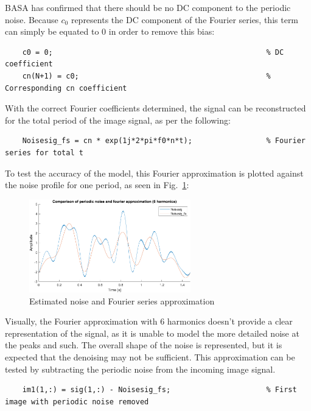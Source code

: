 \documentclass[12pt]{article}
\begin{document}
BASA has confirmed that there should be no DC component to the periodic noise.
Because $c_0$ represents the DC component of the Fourier series, this term can
simply be equated to 0 in order to remove this bias:

\begin{verbatim}
    c0 = 0;                                                 % DC coefficient
    cn(N+1) = c0;                                           % Corresponding cn coefficient
\end{verbatim}

With the correct Fourier coefficients determined, the signal can be
reconstructed for the total period of the image signal, as per the following:
\begin{verbatim}
    Noisesig_fs = cn * exp(1j*2*pi*f0*n*t);                 % Fourier series for total t
\end{verbatim}

To test the accuracy of the model, this Fourier approximation is plotted
against the noise profile for one period, as seen in
Fig.~\ref{fig:p2-noisefscomp}:

\begin{figure}[h]
    \centering
    \includegraphics[width=7cm]{figures/p2-noisefscomp.png}
    \caption{Estimated noise and Fourier series approximation\label{fig:p2-noisefscomp}}
\end{figure}

Visually, the Fourier approximation with 6 harmonics doesn't provide a clear
representation of the signal, as it is unable to model the more detailed noise
at the peaks and such. The overall shape of the noise is represented, but it is
expected that the denoising may not be sufficient. This approximation can be
tested by subtracting the periodic noise from the incoming image signal.

\begin{verbatim}
    im1(1,:) = sig(1,:) - Noisesig_fs;                      % First image with periodic noise removed
\end{verbatim}
\end{document}
